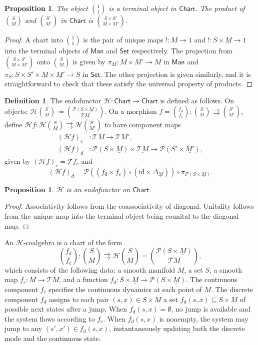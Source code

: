 \documentclass[letterpaper, 10 pt, conference]{IEEEconf}
\newtheorem{prop}[thm]{Proposition}
\theoremstyle{definition}
\newtheorem{defn}[thm]{Definition}
\newcommand{\maps}{\colon}
\newcommand{\id}{\mathrm{id}}
\newcommand{\chart}{\rightrightarrows}
\newcommand{\namedcat}[1]{\mathsf{#1}}
\newcommand{\Chart}{\namedcat{Chart}}
\newcommand{\Man}{\namedcat{Man}}
\newcommand{\Set}{\namedcat{Set}}
\newcommand{\functor}[1]{\mathcal{#1}}
\renewcommand{\H}{\functor{H}}
\renewcommand{\P}{\functor{P}}
\newcommand{\T}{\functor{T}}
\begin{document}
\begin{prop}
\label{prop:Chartproducts}
    The object $\binom{1}{1}$ is a terminal object in $\Chart$. The product of $\binom SM$ and $\binom{S'}{M'}$ in $\Chart$ is $\binom{S \times S'}{M \times M'}$.
\end{prop}
\begin{proof}
    A chart into $\binom{1}{1}$ is the pair of unique maps $! \maps M \to 1$ and $! \maps S \times \underline{M} \to 1$ into the terminal objects of $\Man$ and $\Set$ respectively. The projection from $\binom{S \times S'}{M \times M'}$ onto $\binom SM$ is given by $\pi_M \maps M \times M' \to M$ in $\Man$ and $\pi_S \maps S \times S' \times \underline{M} \times \underline{M'} \to S$ in $\Set$. The other projection is given similarly, and it is straightforward to check that these satisfy the universal property of products.
\end{proof}

\begin{defn}
\label{def:H}
    The endofunctor $\H \maps \Chart \to \Chart$ is defined as follows. On objects: $\H \binom SM \coloneqq \binom{\P(S \times \underline{M})}{\T M}$.
    On a morphism $f = \binom{f_d}{f_c} \maps \binom SM \chart \binom{S'}{M'}$, define $\H f \maps \H\binom SM \chart \H\binom{S'}{M'}$ to have component maps
    \begin{align*}
        (\H f)_c &\maps \T M \to \T M', \\
        (\H f)_d &\maps \P(S \times \underline{M}) \times \underline{\T M} \to \P(S' \times \underline{M'}),
    \end{align*}
    given by $(\H f)_c = \T f_c$ and
    \[
        (\H f)_d = \P((f_d \times \underline{f_c}) \circ (\id \times \Delta_{\underline{M}})) \circ \pi_{\P(S \times \underline{M})}.
    \]
\end{defn}

\begin{prop}
\label{prop:Hfunctor}
    $\H$ is an endofunctor on $\Chart$.
\end{prop}
\begin{proof}
    Associativity follows from the coassociativity of diagonal. Unitality follows from the unique map into the terminal object being counital to the diagonal map.
\end{proof}

An $\H$-coalgebra is a chart of the form
\[
    \binom{f_d}{f_c} \maps \binom SM \chart \H\binom SM = \binom{\P(S \times \underline{M})}{\T M},
\]
which consists of the following data: a smooth manifold $M$, a set $S$, a smooth map $f_c \maps M \to \T M$, and a function $f_d \maps S \times \underline{M} \to \P(S \times \underline{M})$. The continuous component $f_c$ specifies the continuous dynamics at each point of $M$. The discrete component $f_d$ assigns to each pair $(s, x) \in S \times \underline{M}$ a set $f_d(s, x) \subseteq S \times \underline{M}$ of possible next states after a jump. When $f_d(s, x) = \emptyset$, no jump is available and the system flows according to $f_c$. When $f_d(s, x)$ is nonempty, the system may jump to any $(s', x') \in f_d(s, x)$, instantaneously updating both the discrete mode and the continuous state.
\end{document}
